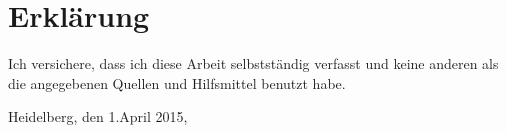 \onecolumn

\chapter*{Erkl\"{a}rung}

Ich versichere, dass ich diese Arbeit selbstst\"{a}ndig verfasst und keine anderen als die angegebenen Quellen und Hilfsmittel benutzt habe.

\vspace{2cm}

Heidelberg, den 1.April 2015,

